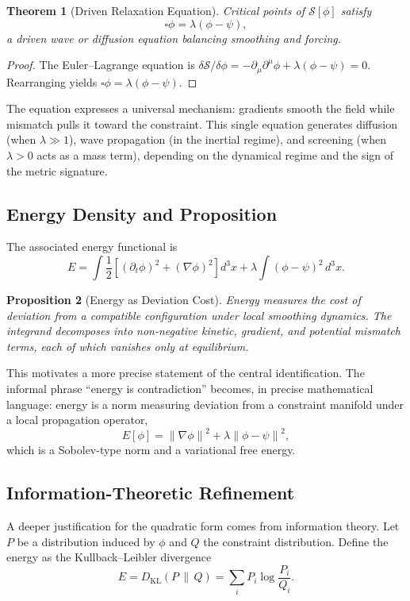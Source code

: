 \documentclass[12pt,a4paper,openany]{book}
\theoremstyle{plain}
\newtheorem{theorem}{Theorem}[chapter]
\newtheorem{proposition}[theorem]{Proposition}
\theoremstyle{definition}
\theoremstyle{remark}
\newcommand{\norm}[1]{\left\|#1\right\|}
\begin{document}
\begin{theorem}[Driven Relaxation Equation]
Critical points of $\mathcal{S}[\phi]$ satisfy
\[
\square\phi = \lambda(\phi - \psi),
\]
a driven wave or diffusion equation balancing smoothing and forcing.
\end{theorem}

\begin{proof}
The Euler--Lagrange equation is $\delta\mathcal{S}/\delta\phi = -\partial_\mu\partial^\mu\phi + \lambda(\phi - \psi) = 0$. Rearranging yields $\square\phi = \lambda(\phi - \psi)$.
\end{proof}

The equation expresses a universal mechanism: gradients smooth the field while mismatch pulls it toward the constraint. This single equation generates diffusion (when $\lambda \gg 1$), wave propagation (in the inertial regime), and screening (when $\lambda > 0$ acts as a mass term), depending on the dynamical regime and the sign of the metric signature.

\subsection{Energy Density and Proposition}

The associated energy functional is
\[
E = \int\frac{1}{2}\left[(\partial_t\phi)^2 + (\nabla\phi)^2\right]d^3x + \lambda\int(\phi - \psi)^2\,d^3x.
\]

\begin{proposition}[Energy as Deviation Cost]
Energy measures the cost of deviation from a compatible configuration under local smoothing dynamics. The integrand decomposes into non-negative kinetic, gradient, and potential mismatch terms, each of which vanishes only at equilibrium.
\end{proposition}

This motivates a more precise statement of the central identification. The informal phrase ``energy is contradiction'' becomes, in precise mathematical language: energy is a norm measuring deviation from a constraint manifold under a local propagation operator,
\[
E[\phi] = \norm{\nabla\phi}^2 + \lambda\norm{\phi - \psi}^2,
\]
which is a Sobolev-type norm and a variational free energy.

\subsection{Information-Theoretic Refinement}

A deeper justification for the quadratic form comes from information theory. Let $P$ be a distribution induced by $\phi$ and $Q$ the constraint distribution. Define the energy as the Kullback--Leibler divergence
\[
E = D_{\mathrm{KL}}(P \,\|\, Q) = \sum_i P_i\log\frac{P_i}{Q_i}.
\]
\end{document}
